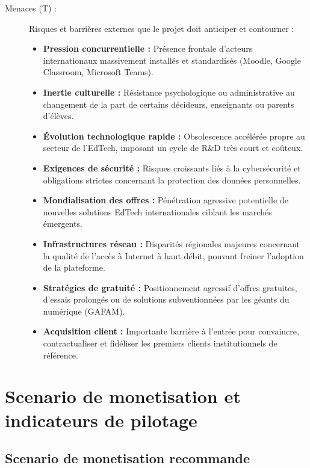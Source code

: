 \documentclass[12pt,a4paper,oneside]{report}
\begin{document}
\begin{description}
    \item[Menaces (T) :] Risques et barrières externes que le projet doit anticiper et contourner :
    \begin{itemize}
        \item \textbf{Pression concurrentielle :} Présence frontale d'acteurs internationaux massivement installés et standardisés (Moodle, Google Classroom, Microsoft Teams).
        \item \textbf{Inertie culturelle :} Résistance psychologique ou administrative au changement de la part de certains décideurs, enseignants ou parents d'élèves.
        \item \textbf{Évolution technologique rapide :} Obsolescence accélérée propre au secteur de l'EdTech, imposant un cycle de R\&D très court et coûteux.
        \item \textbf{Exigences de sécurité :} Risques croissants liés à la cybersécurité et obligations strictes concernant la protection des données personnelles.
        \item \textbf{Mondialisation des offres :} Pénétration agressive potentielle de nouvelles solutions EdTech internationales ciblant les marchés émergents.
        \item \textbf{Infrastructures réseau :} Disparités régionales majeures concernant la qualité de l'accès à Internet à haut débit, pouvant freiner l'adoption de la plateforme.
        \item \textbf{Stratégies de gratuité :} Positionnement agressif d'offres gratuites, d'essais prolongés ou de solutions subventionnées par les géants du numérique (GAFAM).
        \item \textbf{Acquisition client :} Importante barrière à l'entrée pour convaincre, contractualiser et fidéliser les premiers clients institutionnels de référence.
    \end{itemize}
\end{description}
\section{Scenario de monetisation et indicateurs de pilotage}

\subsection{Scenario de monetisation recommande}
\end{document}
